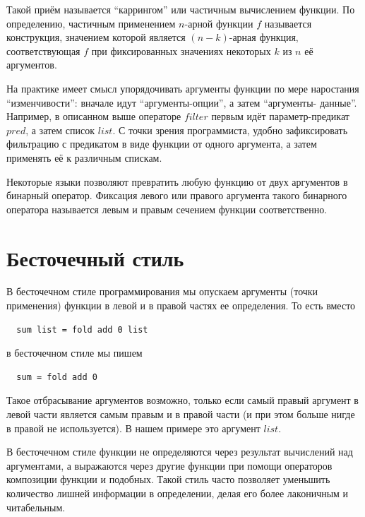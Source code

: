 \documentclass[a4paper,11pt]{article}
\begin{document}
Такой приём называется ``каррингом'' или частичным вычислением функции.
По определению, частичным применением $n$-арной функции $f$ называется 
конструкция, значением которой является $(n-k)$-арная функция, 
соответствующая $f$ при фиксированных значениях некоторых $k$ из $n$ её
аргументов. 

На практике имеет смысл упорядочивать аргументы функции по мере наростания
``изменчивости'': вначале идут ``аргументы-опции'', а затем ``аргументы-
данные''. Например, в описанном выше операторе $filter$ первым идёт
параметр-предикат $pred$, а затем список $list$. С точки зрения программиста,
удобно зафиксировать фильтрацию с предикатом в виде функции от одного 
аргумента, а затем применять её к различным спискам.

Некоторые языки позволяют превратить любую функцию от двух аргументов
в бинарный оператор. Фиксация левого или правого аргумента такого бинарного
оператора называется левым и правым сечением функции соответственно.

\section{Бесточечный стиль}
В бесточечном стиле программирования мы опускаем аргументы (точки применения)
функции в левой и в правой частях ее определения. То есть вместо
\begin{lstlisting}
  sum list = fold add 0 list
\end{lstlisting}
в бесточечном стиле мы пишем
\begin{lstlisting}
  sum = fold add 0  
\end{lstlisting}

Такое отбрасывание аргументов возможно, только если самый правый аргумент в
левой части является самым правым и в правой части (и при этом больше нигде в
правой не используется). В нашем примере это аргумент $list$.

В бесточечном стиле функции не определяются через результат вычислений над 
аргументами, а выражаются через другие функции при помощи операторов композиции
функции и подобных. Такой стиль часто позволяет уменьшить количество лишней
информации в определении, делая его более лаконичным и читабельным.
\end{document}

